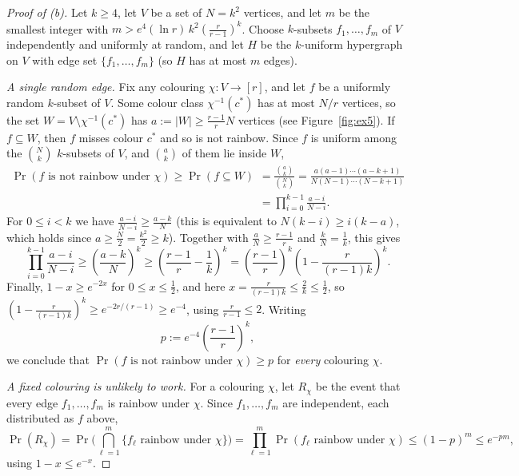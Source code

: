 \documentclass[a4paper,12pt]{article}
\begin{document}
\begin{proof}[Proof of (b)]
	Let $k \ge 4$, let $V$ be a set of $N = k^2$ vertices, and let $m$ be the smallest integer with $m > e^4 (\ln r)\, k^2 \left( \frac{r}{r-1} \right)^k$. Choose $k$-subsets $f_1, \dots, f_m$ of $V$ independently and uniformly at random, and let $H$ be the $k$-uniform hypergraph on $V$ with edge set $\{f_1, \dots, f_m\}$ (so $H$ has at most $m$ edges).

	\emph{A single random edge.} Fix any colouring $\chi : V \to [r]$, and let $f$ be a uniformly random $k$-subset of $V$. Some colour class $\chi^{-1}(c^*)$ has at most $N/r$ vertices, so the set $W = V \setminus \chi^{-1}(c^*)$ has $a := |W| \ge \frac{r-1}{r} N$ vertices (see Figure~\ref{fig:ex5}). If $f \subseteq W$, then $f$ misses colour $c^*$ and so is not rainbow. Since $f$ is uniform among the $\binom{N}{k}$ $k$-subsets of $V$, and $\binom{a}{k}$ of them lie inside $W$,
	\begin{align*}
		\Pr(f \text{ is not rainbow under } \chi) \ge \Pr(f \subseteq W) &= \frac{\binom{a}{k}}{\binom{N}{k}} = \frac{a(a-1)\cdots(a-k+1)}{N(N-1)\cdots(N-k+1)} \\
		&= \prod_{i=0}^{k-1} \frac{a - i}{N - i}.
	\end{align*}
	For $0 \le i < k$ we have $\frac{a-i}{N-i} \ge \frac{a-k}{N}$ (this is equivalent to $N(k-i) \ge i(k-a)$, which holds since $a \ge \frac{N}{2} = \frac{k^2}{2} \ge k$). Together with $\frac{a}{N} \ge \frac{r-1}{r}$ and $\frac{k}{N} = \frac1k$, this gives
	\[
		\prod_{i=0}^{k-1} \frac{a - i}{N - i} \ge \left( \frac{a - k}{N} \right)^k \ge \left( \frac{r-1}{r} - \frac{1}{k} \right)^k = \left( \frac{r-1}{r} \right)^k \left( 1 - \frac{r}{(r-1)k} \right)^k.
	\]
	Finally, $1 - x \ge e^{-2x}$ for $0 \le x \le \frac12$, and here $x = \frac{r}{(r-1)k} \le \frac{2}{k} \le \frac12$, so $\left( 1 - \frac{r}{(r-1)k} \right)^k \ge e^{-2r/(r-1)} \ge e^{-4}$, using $\frac{r}{r-1} \le 2$. Writing
	\[
		p := e^{-4} \left( \frac{r-1}{r} \right)^k,
	\]
	we conclude that $\Pr(f \text{ is not rainbow under } \chi) \ge p$ for \emph{every} colouring $\chi$.

	\emph{A fixed colouring is unlikely to work.} For a colouring $\chi$, let $R_\chi$ be the event that every edge $f_1, \dots, f_m$ is rainbow under $\chi$. Since $f_1, \dots, f_m$ are independent, each distributed as $f$ above,
	\[
		\Pr(R_\chi) = \Pr\Big( \bigcap_{\ell=1}^m \{ \text{$f_\ell$ rainbow under $\chi$} \} \Big) = \prod_{\ell=1}^m \Pr(\text{$f_\ell$ rainbow under $\chi$}) \le (1-p)^m \le e^{-pm},
	\]
	using $1 - x \le e^{-x}$.


\end{proof}
\end{document}
